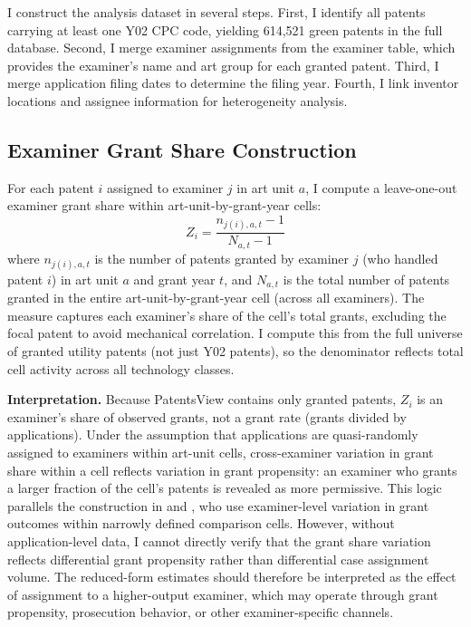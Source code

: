 \documentclass[12pt]{article}
\begin{document}
I construct the analysis dataset in several steps. First, I identify all patents carrying at least one Y02 CPC code, yielding 614,521 green patents in the full database. Second, I merge examiner assignments from the examiner table, which provides the examiner's name and art group for each granted patent. Third, I merge application filing dates to determine the filing year. Fourth, I link inventor locations and assignee information for heterogeneity analysis.

\subsection{Examiner Grant Share Construction}

For each patent $i$ assigned to examiner $j$ in art unit $a$, I compute a leave-one-out examiner grant share within art-unit-by-grant-year cells:
\begin{equation}
Z_{i} = \frac{n_{j(i),a,t} - 1}{N_{a,t} - 1}
\label{eq:leniency}
\end{equation}
where $n_{j(i),a,t}$ is the number of patents granted by examiner $j$ (who handled patent $i$) in art unit $a$ and grant year $t$, and $N_{a,t}$ is the total number of patents granted in the entire art-unit-by-grant-year cell (across all examiners). The measure captures each examiner's share of the cell's total grants, excluding the focal patent to avoid mechanical correlation. I compute this from the full universe of granted utility patents (not just Y02 patents), so the denominator reflects total cell activity across all technology classes.

\textbf{Interpretation.} Because PatentsView contains only granted patents, $Z_i$ is an examiner's share of observed grants, not a grant rate (grants divided by applications). Under the assumption that applications are quasi-randomly assigned to examiners within art-unit cells, cross-examiner variation in grant share within a cell reflects variation in grant propensity: an examiner who grants a larger fraction of the cell's patents is revealed as more permissive. This logic parallels the construction in \citet{sampat2019} and \citet{farremensa2020}, who use examiner-level variation in grant outcomes within narrowly defined comparison cells. However, without application-level data, I cannot directly verify that the grant share variation reflects differential grant propensity rather than differential case assignment volume. The reduced-form estimates should therefore be interpreted as the effect of assignment to a higher-output examiner, which may operate through grant propensity, prosecution behavior, or other examiner-specific channels.
\end{document}
